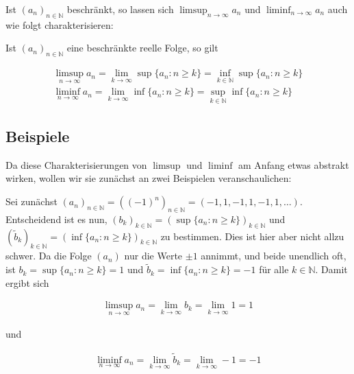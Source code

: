 \documentclass[fontsize=9pt,
               parskip=half-,
               DIV=14,
               listof=chapterentry,
               tocflat]{scrbook}
\begin{document}
Ist $(a_{n})_{n\in \mathbb {N} }$ beschränkt, so lassen sich $\limsup _{n\to \infty }a_{n}$ und $\liminf _{n\to \infty }a_{n}$ auch wie folgt charakterisieren:

\begin{theorem*}
Ist $(a_{n})_{n\in \mathbb {N} }$ eine beschränkte reelle Folge, so gilt

\begin{align*}
\limsup _{n\to \infty }a_{n}=\lim _{k\to \infty }\sup\{a_{n}:n\geq k\}=\inf _{k\in \mathbb {N} }\sup\{a_{n}:n\geq k\}\\\liminf _{n\to \infty }a_{n}=\lim _{k\to \infty }\inf\{a_{n}:n\geq k\}=\sup _{k\in \mathbb {N} }\inf\{a_{n}:n\geq k\}
\end{align*}

\end{theorem*}

\subsection{Beispiele}

Da diese Charakterisierungen von $\limsup $ und $\liminf $ am Anfang etwas abstrakt wirken, wollen wir sie zunächst an zwei Beispielen veranschaulichen:

\begin{example*}
Sei zunächst $(a_{n})_{n\in \mathbb {N} }=((-1)^{n})_{n\in \mathbb {N} }=(-1,1,-1,1,-1,1,\ldots )$. Entscheidend ist es nun, $(b_{k})_{k\in \mathbb {N} }=(\sup\{a_{n}:n\geq k\})_{k\in \mathbb {N} }$ und $({\tilde {b}}_{k})_{k\in \mathbb {N} }=(\inf\{a_{n}:n\geq k\})_{k\in \mathbb {N} }$ zu bestimmen. Dies ist hier aber nicht allzu schwer. Da die Folge $(a_{n})$ nur die Werte $\pm 1$ annimmt, und beide unendlich oft, ist $b_{k}=\sup\{a_{n}:n\geq k\}=1$ und ${\tilde {b}}_{k}=\inf\{a_{n}:n\geq k\}=-1$ für alle $k\in \mathbb {N} $. Damit ergibt sich

\begin{align*}
\limsup _{n\to \infty }a_{n}=\lim _{k\to \infty }b_{k}=\lim _{k\to \infty }1=1
\end{align*}

und

\begin{align*}
\liminf _{n\to \infty }a_{n}=\lim _{k\to \infty }{\tilde {b}}_{k}=\lim _{k\to \infty }-1=-1
\end{align*}

\end{example*}
\end{document}

